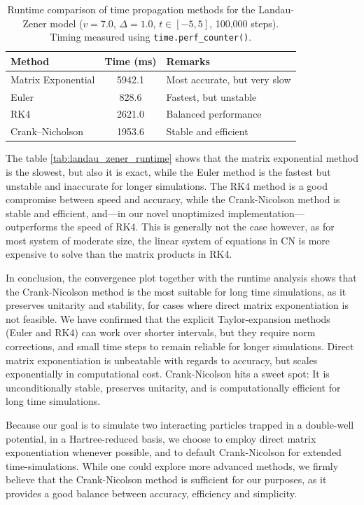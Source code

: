 \documentclass{subfiles}
\begin{document}
\begin{table}[h!]
\centering
\caption{Runtime comparison of time propagation methods for the Landau-Zener model ($v = 7.0$, $\Delta = 1.0$, $t \in [-5, 5]$, 100,000 steps). Timing measured using \texttt{time.perf\_counter()}.}
\begin{tabular}{l c l}
\toprule
\textbf{Method} & \textbf{Time (ms)} & \textbf{Remarks} \\
\midrule
Matrix Exponential & 5942.1 & Most accurate, but very slow \\
Euler              & 828.6  & Fastest, but unstable \\
RK4                & 2621.0 & Balanced performance \\
Crank--Nicholson   & 1953.6 & Stable and efficient \\
\bottomrule
\end{tabular}\label{tab:landau_zener_runtime}
\end{table}
The table \eqref{tab:landau_zener_runtime} shows that the matrix exponential method is the slowest, but also it is exact, while the Euler method is the fastest but unstable and inaccurate for longer simulations. The RK4 method is a good compromise between speed and accuracy, while the Crank-Nicolson method is stable and efficient, and—in our novel unoptimized implementation— outperforms the speed of RK4. This is generally not the case however, as for most system of moderate size, the linear system of equations in CN is more expensive to solve than the matrix products in RK4. 

In conclusion, the convergence plot together with the runtime analysis shows that the Crank-Nicolson method is the most suitable for long time simulations, as it preserves unitarity and stability, for cases where direct matrix exponentiation is not feasible. We have confirmed that the explicit Taylor-expansion methods (Euler and RK4) can work over shorter intervals, but they require norm corrections, and small time steps to remain reliable for longer simulations. Direct matrix exponentiation is unbeatable with regards to accuracy, but scales exponentially in computational cost. Crank-Nicolson hits a sweet spot: It is unconditionally stable, preserves unitarity, and is computationally efficient for long time simulations. 

Because our goal is to simulate two interacting particles trapped in a double-well potential, in a Hartree-reduced basis, we choose to employ direct matrix exponentiation whenever possible, and to default Crank-Nicolson for extended time-simulations. While one could explore more advanced methods, we firmly believe that the Crank-Nicolson method is sufficient for our purposes, as it provides a good balance between accuracy, efficiency and simplicity.
\end{document}
